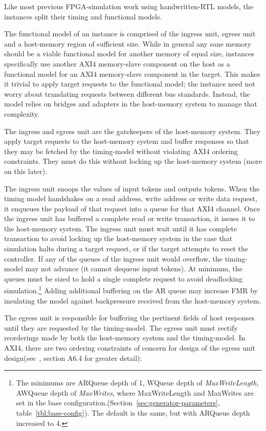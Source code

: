 Like most previous FPGA-simulation work using handwritten-RTL models, the instances
split their timing and functional models.

The functional model of an instance is comprised of the ingress unit, egress
unit and a host-memory region of sufficient size. While in general any sane
memory should be a viable functional model for another memory of equal size,
instances specifically use another AXI4 memory-slave component on the host as a
functional model for an AXI4 memory-slave component in the target. This makes
it trivial to apply target requests to the functional model; the instance need
not worry about translating requests between different bus standards. Instead,
the model relies on bridges and adapters in the host-memory system to manage
that complexity.

The ingress and egress unit are the gatekeepers of the host-memory system. They
apply target requests to the host-memory system and buffer responses so that
they may be fetched by the timing-model without violating AXI4 ordering
constraints. They must do this without locking up the host-memory system (more
on this later).

The ingress unit snoops the values of input tokens and outputs tokens. When the
timing model handshakes on a read address, write address or write data request,
it enqueues the payload of that request into a queue for that AXI4 channel. Once
the ingress unit has buffered a complete read or write transaction, it issues
it to the host-memory system. The ingress unit must wait until it has complete
transaction to avoid locking up the host-memory system in the case that
simulation halts during a target request, or if the target attempts to reset
the controller.  If any of the queues of the ingress unit would overflow, the
timing-model may not advance (it cannot dequeue input tokens). At minimum,
the queues must be sized to hold a single complete request to avoid deadlocking
simulation.\footnote{The minimums are ARQueue depth of 1, WQueue depth of
\emph{MaxWriteLength}, AWQueue depth of \emph{MaxWrites}, where MaxWriteLength
and MaxWrites are set in the base
configuration.(Section~\ref{sec:generator-parameters},
table~\ref{tbl:base-config}). The default is the same, but with ARQueue depth
increased to 4.} Adding additional buffering on the AR queue may increase FMR
by insulating the model against backpressure received from the host-memory
system.

The egress unit is responsible for buffering the pertinent fields of host
responses until they are requested by the timing-model. The egress unit must
rectify reorderings made by both the host-memory system and the timing-model.
In AXI4, there are two ordering constraints of concern for design of the  egress unit
design(see~\cite{amba}, section A6.4 for greater detail):

